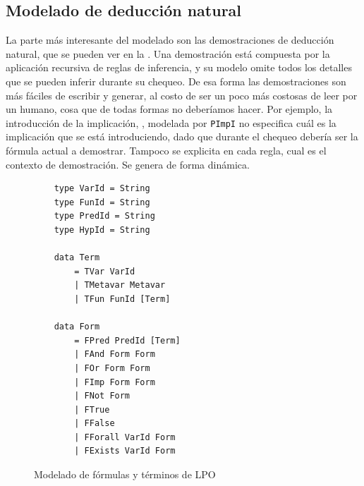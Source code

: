 \subsection{Modelado de deducción natural}
\label{ppa-tool:sec:nd}

La parte más interesante del modelado son las demostraciones de deducción
natural, que se pueden ver en la . Una
demostración está compuesta por la aplicación recursiva de reglas de inferencia,
y su modelo omite todos los detalles que se pueden inferir durante su chequeo.
De esa forma las demostraciones son más fáciles de escribir y generar, al costo
de ser un poco más costosas de leer por un humano, cosa que de todas formas no
deberíamos hacer. Por ejemplo, la introducción de la implicación, ,
modelada por \texttt{PImpI} no especifica cuál es la implicación que se está
introduciendo, dado que durante el chequeo debería ser la fórmula actual a
demostrar. Tampoco se explicita en cada regla, cual es el contexto de
demostración. Se genera de forma dinámica.

\begin{figure}[p]
    \begin{multicols}{2}
    \begin{verbatim}
    type VarId = String
    type FunId = String
    type PredId = String
    type HypId = String
    
    data Term
        = TVar VarId
        | TMetavar Metavar
        | TFun FunId [Term]
    
    data Form
        = FPred PredId [Term]
        | FAnd Form Form
        | FOr Form Form
        | FImp Form Form
        | FNot Form
        | FTrue
        | FFalse
        | FForall VarId Form
        | FExists VarId Form
    \end{verbatim}
    \end{multicols}
    \caption{Modelado de fórmulas y términos de LPO}
    \end{figure}
    

